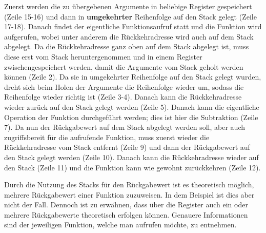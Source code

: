 Zuerst werden die zu übergebenen Argumente in beliebige Register gespeichert
(Zeile 15-16) und dann in \textbf{umgekehrter} Reihenfolge auf den Stack gelegt
(Zeile 17-18). Danach findet der eigentliche Funktionsaufruf statt und die
Funktion wird aufgerufen, wobei unter anderem die Rückkehradresse wird auch auf
dem Stack abgelegt. Da die Rückkehradresse ganz oben auf dem Stack abgelegt ist,
muss diese erst vom Stack heruntergenommen und in einem Register
zwischengespeichert werden, damit die Argumente vom Stack geholt werden können
(Zeile 2). Da sie in umgekehrter Reihenfolge auf den Stack gelegt wurden, dreht
sich beim Holen der Argumente die Reihenfolge wieder um, sodass die Reihenfolge
wieder richtig ist (Zeile 3-4). Danach kann die Rückkehradresse wieder zurück
auf den Stack gelegt werden (Zeile 5). Danach kann die eigentliche Operation der
Funktion durchgeführt werden; dies ist hier die Subtraktion (Zeile 7). Da nun
der Rückgabewert auf dem Stack abgelegt werden soll, aber auch zugriffsbereit
für die aufrufende Funktion, muss zuerst wieder die Rückkehradresse vom Stack
entfernt (Zeile 9) und dann der Rückgabewert auf den Stack gelegt werden (Zeile
10). Danach kann die Rückkehradresse wieder auf den Stack (Zeile 11) und die
Funktion kann wie gewohnt zurückkehren (Zeile 12).

Durch die Nutzung des Stacks für den Rückgabewert ist es theoretisch möglich,
mehrere Rückgabewert einer Funktion zuzuweisen. In dem Beispiel ist dies aber
nicht der Fall.  Dennoch ist zu erwähnen, dass über die Register auch ein oder
mehrere Rückgabewerte theoretisch erfolgen können. Genauere Informationen sind
der jeweiligen Funktion, welche man aufrufen möchte, zu entnehmen.
\clearpage
